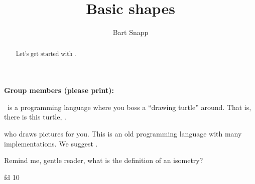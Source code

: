 \documentclass[noauthor,nooutcomes,12pt]{ximera}
\title{Basic shapes}
\author{Bart Snapp}
\begin{document}
\begin{abstract}
Let's get started with \LOGO.
\end{abstract}
\maketitle

\noindent\textbf{Group members (please print):}\ \hrulefill \\

\hrulefill


\LOGO~is a programming language where you boss a ``drawing turtle''
around. That is, there is this turtle, \turtle.

who draws pictures for you. This is an old programming language with
many implementations. We suggest \logoFlavor. 


\begin{problem}
Remind me, gentle reader, what is the definition of an isometry?

\vspace{2.5in}

\end{problem}





\begin{logo}
fd 10
\end{logo}
\end{document}
